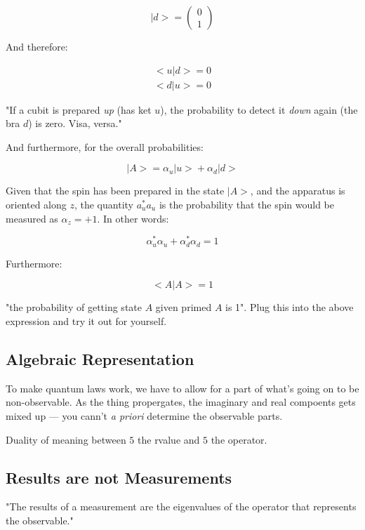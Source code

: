 \documentclass[letterpaper]{article}
\begin{document}
\begin{equation}
    | d \big> = \begin{pmatrix} 0 \\ 1\end{pmatrix}
\end{equation}

And therefore:

\begin{align}
   \big<u|d\big> = 0  \\
   \big<d|u\big> = 0  
\end{align}

"If a cubit is prepared \emph{up} (has ket \(u\)), the probability to detect it \emph{down} again (the bra \(d\)) is zero. Visa, versa."

And furthermore, for the overall probabilities:

\begin{equation}
    |A \big> = \alpha_u | u \big > + \alpha_d | d \big>
\end{equation}

Given that the spin has been prepared in the state \(|A\big>\), and the apparatus is oriented along \(z\), the quantity \(a_u^*a_u\) is the probability that the spin would be measured as \(\alpha_z = +1\). In other words:

\begin{equation}
    \alpha_u^*\alpha_u + \alpha_d^*\alpha_d = 1
\end{equation}

Furthermore:

\begin{equation}
   \big<A|A\big> = 1 
\end{equation}

"the probability of getting state \(A\) given primed \(A\) is 1". Plug this into the above expression and try it out for yourself.

\subsection{Algebraic Representation}
\label{sec:org10f24bd}
To make quantum laws work, we have to allow for a part of what's going on to be non-observable. As the thing propergates, the imaginary and real compoents gets mixed up --- you cann't \emph{a priori} determine the observable parts.

Duality of meaning between \(5\) the rvalue and \(5\) the operator. 

\subsection{Results are not Measurements}
\label{sec:org165b63c}
"The results of a measurement are the eigenvalues of the operator that represents the observable."
\end{document}
